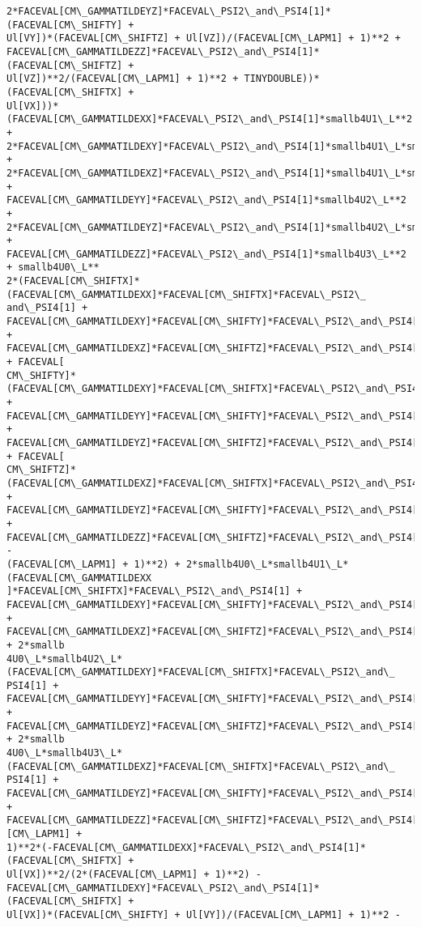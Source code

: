 \documentclass[landscape,letterpaper,10pt,english]{article}
\begin{document}
\begin{Verbatim}[commandchars=\\\{\}]
2*FACEVAL[CM\_GAMMATILDEYZ]*FACEVAL\_PSI2\_and\_PSI4[1]*(FACEVAL[CM\_SHIFTY] +
Ul[VY])*(FACEVAL[CM\_SHIFTZ] + Ul[VZ])/(FACEVAL[CM\_LAPM1] + 1)**2 +
FACEVAL[CM\_GAMMATILDEZZ]*FACEVAL\_PSI2\_and\_PSI4[1]*(FACEVAL[CM\_SHIFTZ] +
Ul[VZ])**2/(FACEVAL[CM\_LAPM1] + 1)**2 + TINYDOUBLE))*(FACEVAL[CM\_SHIFTX] +
Ul[VX]))*(FACEVAL[CM\_GAMMATILDEXX]*FACEVAL\_PSI2\_and\_PSI4[1]*smallb4U1\_L**2 +
2*FACEVAL[CM\_GAMMATILDEXY]*FACEVAL\_PSI2\_and\_PSI4[1]*smallb4U1\_L*smallb4U2\_L +
2*FACEVAL[CM\_GAMMATILDEXZ]*FACEVAL\_PSI2\_and\_PSI4[1]*smallb4U1\_L*smallb4U3\_L +
FACEVAL[CM\_GAMMATILDEYY]*FACEVAL\_PSI2\_and\_PSI4[1]*smallb4U2\_L**2 +
2*FACEVAL[CM\_GAMMATILDEYZ]*FACEVAL\_PSI2\_and\_PSI4[1]*smallb4U2\_L*smallb4U3\_L +
FACEVAL[CM\_GAMMATILDEZZ]*FACEVAL\_PSI2\_and\_PSI4[1]*smallb4U3\_L**2 + smallb4U0\_L**
2*(FACEVAL[CM\_SHIFTX]*(FACEVAL[CM\_GAMMATILDEXX]*FACEVAL[CM\_SHIFTX]*FACEVAL\_PSI2\_
and\_PSI4[1] +
FACEVAL[CM\_GAMMATILDEXY]*FACEVAL[CM\_SHIFTY]*FACEVAL\_PSI2\_and\_PSI4[1] +
FACEVAL[CM\_GAMMATILDEXZ]*FACEVAL[CM\_SHIFTZ]*FACEVAL\_PSI2\_and\_PSI4[1]) + FACEVAL[
CM\_SHIFTY]*(FACEVAL[CM\_GAMMATILDEXY]*FACEVAL[CM\_SHIFTX]*FACEVAL\_PSI2\_and\_PSI4[1]
+ FACEVAL[CM\_GAMMATILDEYY]*FACEVAL[CM\_SHIFTY]*FACEVAL\_PSI2\_and\_PSI4[1] +
FACEVAL[CM\_GAMMATILDEYZ]*FACEVAL[CM\_SHIFTZ]*FACEVAL\_PSI2\_and\_PSI4[1]) + FACEVAL[
CM\_SHIFTZ]*(FACEVAL[CM\_GAMMATILDEXZ]*FACEVAL[CM\_SHIFTX]*FACEVAL\_PSI2\_and\_PSI4[1]
+ FACEVAL[CM\_GAMMATILDEYZ]*FACEVAL[CM\_SHIFTY]*FACEVAL\_PSI2\_and\_PSI4[1] +
FACEVAL[CM\_GAMMATILDEZZ]*FACEVAL[CM\_SHIFTZ]*FACEVAL\_PSI2\_and\_PSI4[1]) -
(FACEVAL[CM\_LAPM1] + 1)**2) + 2*smallb4U0\_L*smallb4U1\_L*(FACEVAL[CM\_GAMMATILDEXX
]*FACEVAL[CM\_SHIFTX]*FACEVAL\_PSI2\_and\_PSI4[1] +
FACEVAL[CM\_GAMMATILDEXY]*FACEVAL[CM\_SHIFTY]*FACEVAL\_PSI2\_and\_PSI4[1] +
FACEVAL[CM\_GAMMATILDEXZ]*FACEVAL[CM\_SHIFTZ]*FACEVAL\_PSI2\_and\_PSI4[1]) + 2*smallb
4U0\_L*smallb4U2\_L*(FACEVAL[CM\_GAMMATILDEXY]*FACEVAL[CM\_SHIFTX]*FACEVAL\_PSI2\_and\_
PSI4[1] + FACEVAL[CM\_GAMMATILDEYY]*FACEVAL[CM\_SHIFTY]*FACEVAL\_PSI2\_and\_PSI4[1] +
FACEVAL[CM\_GAMMATILDEYZ]*FACEVAL[CM\_SHIFTZ]*FACEVAL\_PSI2\_and\_PSI4[1]) + 2*smallb
4U0\_L*smallb4U3\_L*(FACEVAL[CM\_GAMMATILDEXZ]*FACEVAL[CM\_SHIFTX]*FACEVAL\_PSI2\_and\_
PSI4[1] + FACEVAL[CM\_GAMMATILDEYZ]*FACEVAL[CM\_SHIFTY]*FACEVAL\_PSI2\_and\_PSI4[1] +
FACEVAL[CM\_GAMMATILDEZZ]*FACEVAL[CM\_SHIFTZ]*FACEVAL\_PSI2\_and\_PSI4[1]))/((FACEVAL
[CM\_LAPM1] +
1)**2*(-FACEVAL[CM\_GAMMATILDEXX]*FACEVAL\_PSI2\_and\_PSI4[1]*(FACEVAL[CM\_SHIFTX] +
Ul[VX])**2/(2*(FACEVAL[CM\_LAPM1] + 1)**2) -
FACEVAL[CM\_GAMMATILDEXY]*FACEVAL\_PSI2\_and\_PSI4[1]*(FACEVAL[CM\_SHIFTX] +
Ul[VX])*(FACEVAL[CM\_SHIFTY] + Ul[VY])/(FACEVAL[CM\_LAPM1] + 1)**2 -

\end{Verbatim}
\end{document}
